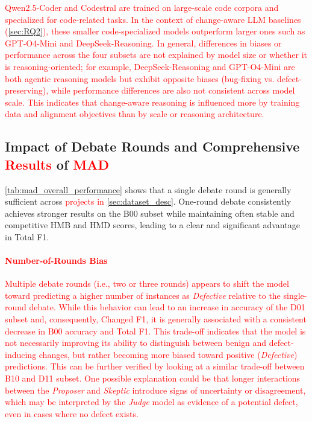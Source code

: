 \documentclass[authoryear,final,5p,times,twocolumn]{elsarticle}
\theoremstyle{plain}
\begin{document}
\textcolor{red}{
Qwen2.5-Coder and Codestral are trained on large-scale code corpora and specialized for code-related tasks. In the context of change-aware LLM baselines (\autoref{sec:RQ2}), these smaller code-specialized models outperform larger ones such as GPT-O4-Mini and DeepSeek-Reasoning. In general, differences in biases or performance across the four subsets are not explained by model size or whether it is reasoning-oriented; for example, DeepSeek-Reasoning and GPT-O4-Mini are both agentic reasoning models but exhibit opposite biases (bug-fixing vs. defect-preserving), while performance differences are also not consistent across model scale. This indicates that change-aware reasoning is influenced more by training data and alignment objectives than by scale or reasoning architecture.
}

\subsection{Impact of Debate Rounds and Comprehensive \textcolor{red}{Results} of \textcolor{red}{MAD}}
\label{sec:impact_debate}
\autoref{tab:mad_overall_performance} shows that a single debate round is generally sufficient across \textcolor{red}{projects in \autoref{sec:dataset_desc}}. One-round debate consistently achieves stronger results on the B00 subset while maintaining often stable and competitive HMB and HMD scores, leading to a clear and significant advantage in Total F1.
\textcolor{red}{
\paragraph{Number-of-Rounds Bias}
Multiple debate rounds (i.e., two or three rounds) appears to shift the model toward predicting a higher number of instances as \textit{Defective} relative to the single-round debate. While this behavior can lead to an increase in accuracy of the D01 subset and, consequently, Changed F1, it is generally associated with a consistent decrease in B00 accuracy and Total F1. This trade-off indicates that the model is not necessarily improving its ability to distinguish between benign and defect-inducing changes, but rather becoming more biased toward positive (\textit{Defective}) predictions. This can be further verified by looking at a similar trade-off between B10 and D11 subset. One possible explanation could be that longer interactions between the \emph{Proposer} and \emph{Skeptic} introduce signs of uncertainty or disagreement, which may be interpreted by the \emph{Judge} model as evidence of a potential defect, even in cases where no defect exists.
}
\end{document}
